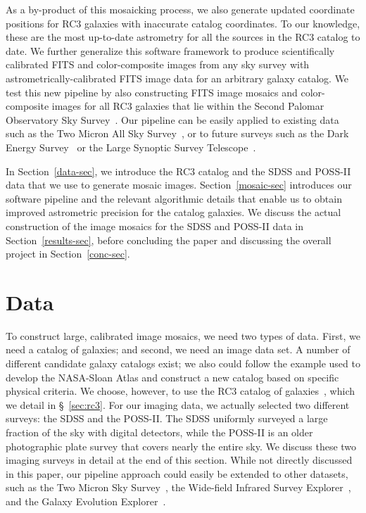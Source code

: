 \documentclass[authoryear, 12pt, 5p, times]{elsarticle}
\begin{document}
As a by-product of this mosaicking process, we also generate updated coordinate positions for RC3 galaxies with inaccurate catalog coordinates. To our knowledge, these are the most up-to-date astrometry for all the sources in the RC3 catalog to date. We further generalize this software framework to produce scientifically calibrated FITS and color-composite images from any sky survey with astrometrically-calibrated FITS image data for an arbitrary galaxy catalog. We test this new pipeline by also constructing FITS image mosaics and color-composite images for all RC3 galaxies that lie within the Second Palomar Observatory Sky Survey~\citep[POSS-II;][]{poss2}. Our pipeline can be easily applied to existing data such as the Two Micron All Sky Survey~\citep[2MASS;][]{2mass}, or to future surveys such as the Dark Energy Survey~\citep[DES;][]{des} or the Large Synoptic Survey Telescope~\citep[LSST;][]{lsst}.

In Section~\ref{data-sec}, we introduce the RC3 catalog and the SDSS and POSS-II data that we use to generate mosaic images. Section~\ref{mosaic-sec} introduces our software pipeline and the relevant algorithmic details that enable us to obtain improved astrometric precision for the catalog galaxies. We discuss the actual construction of the image mosaics for the SDSS and POSS-II data in Section~\ref{results-sec}, before concluding the paper and discussing the overall project in Section~\ref{conc-sec}. 

\section{Data\label{data-sec}}

To construct large, calibrated image mosaics, we need two types of data. First, we need a catalog of galaxies; and second, we need an image data set. A number of different candidate galaxy catalogs exist; we also could follow the example used to develop the NASA-Sloan Atlas and construct a new catalog based on specific physical criteria. We choose, however, to use the RC3 catalog of galaxies~\citep{rc3}, which we detail in \S~\ref{sec:rc3}. For our imaging data, we actually selected two different surveys: the SDSS and the POSS-II. The SDSS uniformly surveyed a large fraction of the sky with digital detectors, while the POSS-II is an older photographic plate survey that covers nearly the entire sky. We discuss these two imaging surveys in detail at the end of this section. While not directly discussed in this paper, our pipeline approach could easily be extended to other datasets, such as the Two Micron Sky Survey~\citep{2mass}, the Wide-field Infrared Survey Explorer~\citep{wise}, and the Galaxy Evolution Explorer~\citep{galex}.
\end{document}
